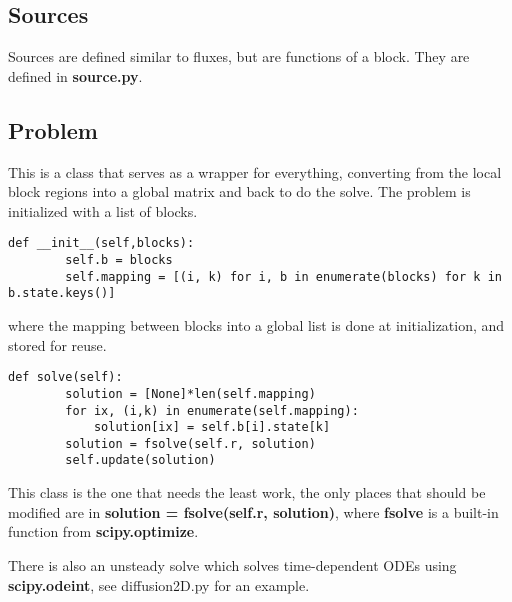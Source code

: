 \documentclass[11pt]{article}
\begin{document}
\subsection{Sources}
Sources are defined similar to fluxes, but are functions of a block. They are defined in {\bf source.py}.
\subsection{Problem}
This is a class that serves as a wrapper for everything, converting from the local block regions into a global matrix and back to do the solve. The problem is initialized with a list of blocks.
\begin{verbatim}
def __init__(self,blocks):
		self.b = blocks
		self.mapping = [(i, k) for i, b in enumerate(blocks) for k in b.state.keys()]
\end{verbatim}
where the mapping between blocks into a global list is done at initialization, and stored for reuse. 
\begin{verbatim}
def solve(self):
		solution = [None]*len(self.mapping)
		for ix, (i,k) in enumerate(self.mapping):
			solution[ix] = self.b[i].state[k]
		solution = fsolve(self.r, solution)
		self.update(solution)
\end{verbatim}
This class is the one that needs the least work, the only places that should be modified are in {\bf solution = fsolve(self.r, solution)}, where {\bf fsolve} is a built-in function from {\bf scipy.optimize}.

There is also an unsteady solve which solves time-dependent ODEs using {\bf scipy.odeint}, see diffusion2D.py for an example.
\end{document}
